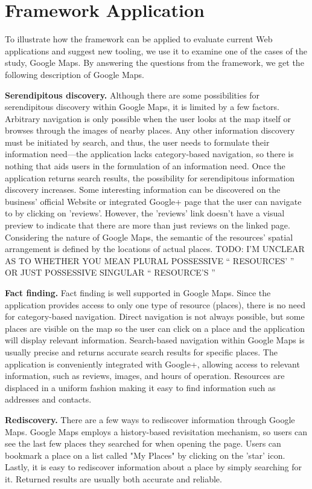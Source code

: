\documentclass{casconpaper}
\begin{document}
{{\section{Framework Application}
To illustrate how the framework can be applied to evaluate current Web applications and suggest new tooling, we use it to examine one of the cases of the study, Google Maps. By answering the questions from the framework, we get the following description of Google Maps.

\textbf{Serendipitous discovery.} Although there are some possibilities for serendipitous discovery within Google Maps, it is limited by a few factors. Arbitrary navigation is only possible when the user looks at the map itself or browses through the images of nearby places. Any other information discovery must be initiated by search, and thus, the user needs to formulate their information need---the application lacks category-based navigation, so there is nothing that aids users in the formulation of an information need. Once the application returns search results, the possibility for serendipitous information discovery increases. Some interesting information can be discovered on the business' official Website or integrated Google+ page that the user can navigate to by clicking on 'reviews'. However, the 'reviews' link doesn't have a visual preview to indicate that there are more than just reviews on the linked page. Considering the nature of Google Maps, the semantic of the resources' spatial arrangement is defined by the locations of actual places. TODO: I'M UNCLEAR AS TO WHETHER YOU MEAN PLURAL POSSESSIVE "` RESOURCES' "' OR JUST POSSESSIVE SINGULAR "` RESOURCE'S "'

\textbf{Fact finding.} Fact finding is well supported in Google Maps. Since the application provides access to only one type of resource (places), there is no need for category-based navigation. Direct navigation is not always possible, but some places are visible on the map so the user can click on a place and the application will display relevant information. Search-based navigation within Google Maps is usually precise and returns accurate search results for specific places. The application is conveniently integrated with Google+, allowing access to relevant information, such as reviews, images, and hours of operation. Resources are displaced in a uniform fashion making it easy to find information such as addresses and contacts. 

\textbf{Rediscovery.} There are a few ways to rediscover information through Google Maps. Google Maps employs a history-based revisitation mechanism, so users can see the last few places they searched for when opening the page. Users can bookmark a place on a list called "My Places" by clicking on the 'star' icon. Lastly, it is easy to rediscover information about a place by simply searching for it. Returned results are usually both accurate and reliable.

}}
\end{document}
